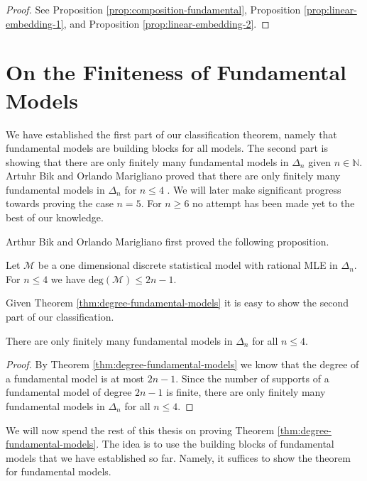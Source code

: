 \begin{proof}
    See Proposition \ref{prop:composition-fundamental}, Proposition \ref{prop:linear-embedding-1}, and Proposition \ref{prop:linear-embedding-2}.
\end{proof}

\section{On the Finiteness of Fundamental Models}

We have established the first part of our classification theorem, namely that fundamental models are building blocks for all models. The second part is showing that there are only finitely many fundamental models in \( \Delta_n \) given \( n \in \mathbb{N} \). Artuhr Bik and Orlando Marigliano proved that there are only finitely many fundamental models in \( \Delta_n \) for \( n \leq 4 \) \cite{bik2022classifying}. We will later make significant progress towards proving the case \( n = 5 \). For \( n \geq 6 \) no attempt has been made yet to the best of our knowledge.

Arthur Bik and Orlando Marigliano first proved the following proposition.

\begin{theorem}\label{thm:degree-fundamental-models}
    Let \( \mathcal{M} \) be a one dimensional discrete statistical model with rational MLE in \( \Delta_n \). For \(n \leq 4 \) we have \( \mathrm{deg}(\mathcal{M}) \leq 2n - 1\).
\end{theorem}

Given Theorem \ref{thm:degree-fundamental-models} it is easy to show the second part of our classification.

\begin{theorem}\label{thm:finiteness-fundamental-models}
    There are only finitely many fundamental models in \( \Delta_n \) for all \( n \leq 4 \).
\end{theorem}

\begin{proof}
    By Theorem \ref{thm:degree-fundamental-models} we know that the degree of a fundamental model is at most \( 2n - 1 \). Since the number of supports of a fundamental model of degree \( 2n - 1 \) is finite, there are only finitely many fundamental models in \( \Delta_n \) for all \( n \leq 4 \).
\end{proof}

We will now spend the rest of this thesis on proving Theorem \ref{thm:degree-fundamental-models}. The idea is to use the building blocks of fundamental models that we have established so far. Namely, it suffices to show the theorem for fundamental models.

